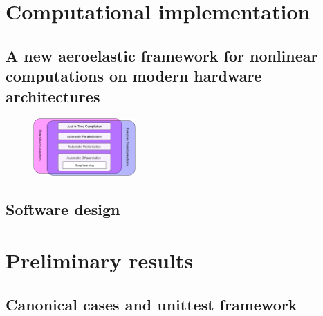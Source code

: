 \documentclass[11pt]{article}
\begin{document}
\section{Computational implementation}
\label{sec:orgc001cf5}
\subsection{A new aeroelastic framework for nonlinear computations on modern hardware architectures}
\label{sec:org8e8e70b}

\begin{figure}[htbp]
\centering
\includegraphics[width=0.35\textwidth]{./img/JAXfeatures.png}
\caption{\label{fig:org04b5e20}}
\end{figure}
\subsection{Software design}
\label{sec:org99304fa}

\section{Preliminary results}
\label{sec:orgeb19789}
\subsection{Canonical cases and unittest framework}
\label{sec:org9f8fae1}
\end{document}
